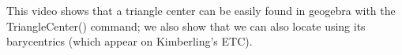 This video shows that a triangle center can be easily found in geogebra with the TriangleCenter() command; we also show that we can also locate using its barycentrics (which appear on Kimberling's ETC).